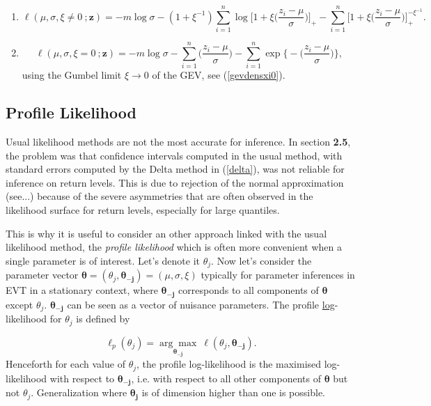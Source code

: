 \documentclass[11pt,a4paper,openany ]{book}
\begin{document}
\begin{enumerate}
	\item \begin{equation} \label{llik12}
	\ell(\mu,\sigma,\xi\neq 0\ ;\textbf{z})= 
	-m\log\sigma-(1+\xi^{-1})\sum_{i=1}^n\log\bigg[1+\xi\bigg(\frac{z_i-\mu}{\sigma}\bigg)\bigg]_+-\sum_{i=1}^n\bigg[1+\xi\bigg(\frac{z_i-\mu}{\sigma}\bigg)\bigg]_+^{-\xi^{-1}}.
	\end{equation}
	
	
	
	\item \begin{equation} \label{llik0}
	\ell(\mu,\sigma,\xi=0\ ;\textbf{z})=-m\log 
	\sigma-\sum_{i=1}^n\bigg(\frac{z_i-\mu}{\sigma}\bigg)-\sum_{i=1}^{n}\exp\bigg\{-\bigg(\frac{z_i-\mu}{\sigma}\bigg)\bigg\},
	\end{equation}
	using the Gumbel limit $\xi\rightarrow 0$ of the GEV, see (\ref{gevdensxi0}).
\end{enumerate}


\subsection*{Profile Likelihood}

Usual likelihood methods are not the most accurate for inference. In section \textbf{2.5}, 
the problem was that confidence intervals computed in the usual method, with standard 
errors computed by the Delta method in (\ref{delta}), was not reliable for inference on 
return levels. This is due to rejection of the normal approximation (see...) because of the 
severe asymmetries that are often observed in the likelihood surface for return levels, 
especially for large quantiles.
\cite{bolivar_profile_2010}

This is why it is useful to consider an other approach linked with the usual likelihood method, the \emph{profile likelihood} which is often more convenient when a single parameter is of interest. Let's denote it $\theta_j$. Now let's consider the parameter vector $\boldsymbol{\theta}=(\theta_j,\boldsymbol{\theta_{-j}})= (\mu,\sigma,\xi)$ typically for parameter inferences in EVT in a stationary context, where $\boldsymbol{\theta_{-j}}$ corresponds to all components of $\boldsymbol{\theta}$ except $\theta_j$. $\boldsymbol{\theta_{-j}}$ can be seen as a vector of nuisance parameters.
The profile \underline{log}-likelihood for $\theta_j$ is defined by 

\begin{equation}
\ell_p(\theta_j)=\underset{\boldsymbol{\theta_{-j}}}{\mathrm{\arg\max}}\ \ell (\theta_j,\boldsymbol{\theta_{-j}}).
\end{equation}
Henceforth for each value of $\theta_j$, the profile log-likelihood is the maximised 
log-likelihood with respect to $\boldsymbol{\theta_{-j}}$, i.e. with respect to all other 
components of $\boldsymbol{\theta}$ but not $\theta_j$.
Generalization where $\boldsymbol{\theta_j}$ is of dimension higher than one is possible.
\end{document}
